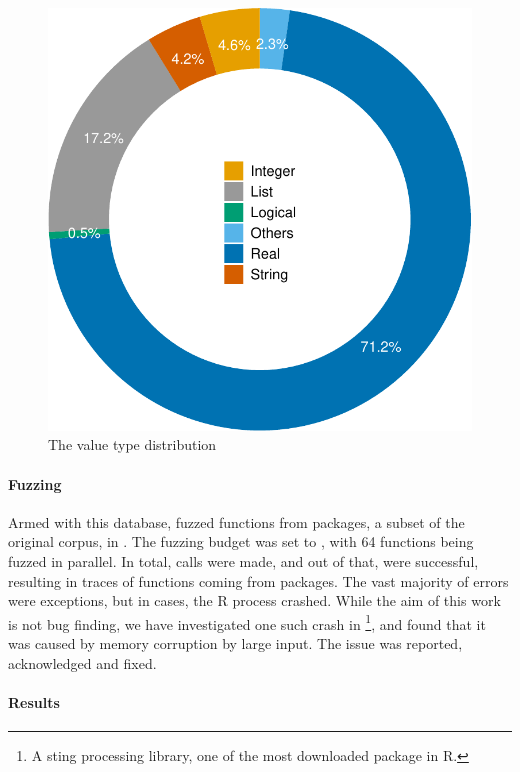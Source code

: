 \documentclass[sigplan,screen]{acmart}
\begin{document}
\begin{figure}
    \centering
    \includegraphics[width=.6\columnwidth]{code-and-figures/argsdb-value-distribution.pdf}
    \vspace{-3mm}
    \caption{The \sxpdb value type distribution}
    \label{fig:argsdb-value-distribution}
\end{figure}

\paragraph{Fuzzing}

Armed with this database, \tool fuzzed \UFNumFunctions functions from \UFNumPackages packages, a subset of the original corpus, in \UFTracingTime.
The fuzzing budget was set to \UFTracingBudget, with 64 functions being fuzzed in parallel.
In total, \UFNumTracesRnd calls were made, and out of that, \UFRatioSucesssTraces were successful, resulting in \UFNumSuccessTraces traces of \UFNumSuccessFunctions functions coming from \UFNumSuccessPackages packages.
The vast majority of errors were exceptions, but in \UFNumCrashedRSessions cases, the R process crashed.
While the aim of this work is not bug finding, we have investigated one such crash in \footnote{A sting processing library, one of the most downloaded package in R.}, and found that it was caused by memory corruption by large input.
The issue was reported, acknowledged and fixed.

\paragraph{Results}
\end{document}
